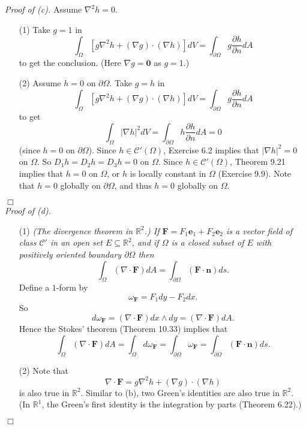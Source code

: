 \documentclass{article}
\begin{document}
\emph{Proof of (c).}
Assume $\nabla^2 h = 0$.
\begin{enumerate}
\item[(1)]
  Take $g = 1$ in
  \[
    \int_{\Omega}[ g\nabla^2 h + (\nabla g)\cdot(\nabla h) ] dV
    = \int_{\partial \Omega} g \frac{\partial h}{\partial n} dA
  \]
  to get the conclusion.
  (Here $\nabla g = \mathbf{0}$ as $g = 1$.)

\item[(2)]
  Assume $h = 0$ on $\partial\Omega$.
  Take $g = h$ in
  \[
    \int_{\Omega}[ g\nabla^2 h + (\nabla g)\cdot(\nabla h) ] dV
    = \int_{\partial \Omega} g \frac{\partial h}{\partial n} dA
  \]
  to get
  \[
    \int_{\Omega} |\nabla h|^2 dV
    = \int_{\partial \Omega} h \frac{\partial h}{\partial n} dA
    = 0
  \]
  (since $h = 0$ on $\partial\Omega$).
  Since $h \in \mathscr{C}'(\Omega)$, Exercise 6.2 implies that
  $|\nabla h|^2 = 0$ on $\Omega$.
  So $D_1 h = D_2 h = D_3 h = 0$ on $\Omega$.
  Since $h \in \mathscr{C}'(\Omega)$, Theorem 9.21 implies that
  $h = 0$ on $\Omega$, or
  $h$ is locally constant in $\Omega$ (Exercise 9.9).
  Note that $h = 0$ globally on $\partial \Omega$,
  and thus $h = 0$ globally on $\Omega$.
\end{enumerate}
$\Box$ \\



\emph{Proof of (d).}
\begin{enumerate}
\item[(1)]
  \emph{(The divergence theorem in $\mathbb{R}^2$.)
  If $\mathbf{F} = F_1 \mathbf{e}_1 + F_2 \mathbf{e}_2$ is a vector field of class
  $\mathscr{C}'$ in an open set $E \subseteq \mathbb{R}^2$,
  and if $\Omega$ is a closed subset of $E$ with positively oriented boundary $\partial\Omega$
  then}
  \[
    \int_{\Omega} (\nabla \cdot \mathbf{F}) dA
    = \int_{\partial\Omega} (\mathbf{F} \cdot \mathbf{n}) ds.
  \]
  Define a $1$-form by
  \[
    \omega_{\mathbf{F}} = F_1 dy - F_2 dx.
  \]
  So
  \[
    d\omega_{\mathbf{F}}
    = (\nabla \cdot \mathbf{F})dx \wedge dy
    = (\nabla \cdot \mathbf{F})dA.
  \]
  Hence the Stokes' theorem (Theorem 10.33) implies that
  \[
    \int_{\Omega} (\nabla \cdot \mathbf{F}) dA
    = \int_{\Omega} d\omega_{\mathbf{F}}
    = \int_{\partial\Omega} \omega_{\mathbf{F}}
    = \int_{\partial\Omega} (\mathbf{F} \cdot \mathbf{n}) ds.
  \]

\item[(2)]
  Note that
  \[
    \nabla \cdot \mathbf{F} = g \nabla^2 h + (\nabla g) \cdot (\nabla h)
  \]
  is also true in $\mathbb{R}^2$.
  Similar to (b), two Green's identities are also true in $\mathbb{R}^2$.
  (In $\mathbb{R}^1$, the Green's first identity is
  the integration by parts (Theorem 6.22).)
\end{enumerate}
$\Box$ \\\\
\end{document}
